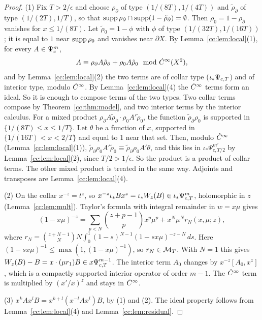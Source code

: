 \begin{proof}
(1) Fix \(T>2/\epsilon\) and choose \(\rho_\partial\) of type
\((1/(8T),1/(4T))\) and \(\tilde\rho_\partial\) of type \((1/(2T),1/T)\),
so that \(\operatorname{supp}\rho_\partial\cap\operatorname{supp}(1-\tilde\rho_\partial)=\emptyset\).
Then \(\rho_0=1-\rho_\partial\) vanishes for \(x\le1/(8T)\). Let
\(\tilde\rho_0=1-\phi\) with \(\phi\) of type \((1/(32T),1/(16T))\); it is
equal to \(1\) near \(\operatorname{supp}\rho_0\) and vanishes near \(\partial X\). By Lemma~\ref{cc:lem:local}(1), for every
\(A\in\Psi_{c}^m\),
\[
 A\equiv\rho_\partial A\tilde\rho_\partial+\rho_0A\tilde\rho_0
 \mod{\dot C^\infty}(X^2),
\]
and by Lemma~\ref{cc:lem:local}(2) the two terms are of collar type
(\(\iota_*\Psi_{c,T}\)) and of interior type, modulo \(\dot C^\infty\). By
Lemma~\ref{cc:lem:local}(4) the \(\dot C^\infty\) terms form an ideal. So it is
enough to compose terms of the two types. Two collar terms compose by
Theorem~\ref{cc:thm:model}, and two interior terms by the interior
calculus. For a mixed product
\(\rho_\partial A\tilde\rho_\partial\cdot\rho_0A'\tilde\rho_0\), the
function \(\tilde\rho_\partial\rho_0\) is supported in
\(\{1/(8T)\le x\le1/T\}\). Let \(\theta\) be a function of \(x\),
supported in \(\{1/(16T)<x<2/T\}\) and equal to \(1\) near that
set. Then, modulo \(\dot C^\infty\) (Lemma~\ref{cc:lem:local}(1)),
\(\tilde\rho_\partial\rho_0A'\tilde\rho_0\equiv
\tilde\rho_\partial\rho_0A'\theta\), and this lies in
\(\iota_*\Psi_{c,T/2}^{m'}\) by Lemma~\ref{cc:lem:local}(2), since
\(T/2>1/\epsilon\). So the product is a product of collar terms. The
other mixed product is treated in the same way. Adjoints and transposes are
Lemma~\ref{cc:lem:local}(4).

(2) On the collar \(x^{-z}=t^z\), so
\(x^{-z}\iota_*Bx^z=\iota_*W_z(B)\in\iota_*\Psi_{c,T}^m\), holomorphic in \(z\)
(Lemma~\ref{cc:lem:mult}). Taylor's formula with integral remainder in
\(w=x\mu\) gives
\begin{equation}\label{cc:eq:binom}
 (1-x\mu)^{-z}=\sum_{p<N}\binom{z+p-1}{p}x^p\mu^p+x^N\mu^Nr_N(x,\mu;z),
\end{equation}
where \(r_N=\binom{z+N-1}{N}N\int_0^1(1-s)^{N-1}(1-sx\mu)^{-z-N}\,ds\).
Here \((1-sx\mu)^{-1}\le\max(1,(1-x\mu)^{-1})\), so \(r_N\in\mathcal M_T\). With
\(N=1\) this gives \(W_z(B)-B=x\cdot(\mu r_1)B\in x\Psi_{c,T}^{m-1}\). The
interior term \(A_0\) changes by \(x^{-z}[A_0,x^z]\), which is a
compactly supported interior operator of order \(m-1\). The \(\dot C^\infty\) term
is multiplied by \((x'/x)^z\) and stays in \(\dot C^\infty\).

(3) \(x^kAx^lB=x^{k+l}(x^{-l}Ax^l)B\), by (1) and (2). The ideal property
follows from Lemma~\ref{cc:lem:local}(4) and Lemma~\ref{cc:lem:residual}.
\end{proof}

